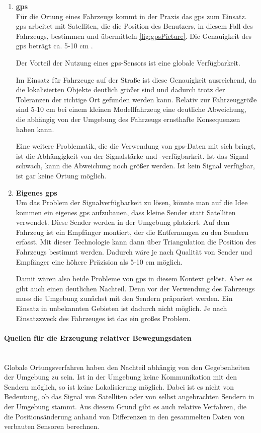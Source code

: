 \begin{enumerate}[leftmargin=*]
    \item \textbf{\acf{gps}} \\
    Für die Ortung eines Fahrzeugs kommt in der Praxis das \ac{gps} zum Einsatz. 
    \ac{gps} arbeitet mit Satelliten, die die Position des Benutzers, in diesem Fall des Fahrzeugs, bestimmen und übermitteln \cite{ashby2003relativity} \autoref{fig:gpsPicture}. 
    Die Genauigkeit des \ac{gps} beträgt ca. 5-10 cm \cite{ashby2003relativity}.

    Der Vorteil der Nutzung eines \ac{gps}-Sensors ist eine globale Verfügbarkeit.

    Im Einsatz für Fahrzeuge auf der Straße ist diese Genauigkeit ausreichend, 
    da die lokalisierten Objekte deutlich größer sind und dadurch trotz der Toleranzen der richtige Ort gefunden werden kann.
    Relativ zur Fahrzeuggröße sind 5-10 cm bei einem kleinen Modellfahrzeug eine deutliche Abweichung, die abhängig von der Umgebung des Fahrzeugs ernsthafte Konsequenzen haben kann.

    Eine weitere Problematik, die die Verwendung von \ac{gps}-Daten mit sich bringt, ist die Abhängigkeit von der Signalstärke und -verfügbarkeit. 
    Ist das Signal schwach, kann die Abweichung noch größer werden. 
    Ist kein Signal verfügbar, ist gar keine Ortung möglich.
    
    \item \textbf{Eigenes \ac{gps}} \\
    Um das Problem der Signalverfügbarkeit zu lösen, könnte man auf die Idee kommen ein eigenes \acf{gps} aufzubauen, dass kleine Sender statt Satelliten verwendet.
    Diese Sender werden in der Umgebung platziert. 
    Auf dem Fahrzeug ist ein Empfänger montiert, der die Entfernungen zu den Sendern erfasst.
    Mit dieser Technologie kann dann über Triangulation die Position des Fahrzeugs bestimmt werden. 
    Dadurch wäre je nach Qualität von Sender und Empfänger eine höhere Präzision als 5-10 cm möglich. 
    
    Damit wären also beide Probleme von \ac{gps} in diesem Kontext gelöst. 
    Aber es gibt auch einen deutlichen Nachteil. 
    Denn vor der Verwendung des Fahrzeugs muss die Umgebung zunächst mit den Sendern präpariert werden. 
    Ein Einsatz in unbekannten Gebieten ist dadurch nicht möglich. 
    Je nach Einsatzzweck des Fahrzeuges ist das ein großes Problem.
\end{enumerate}

\paragraph{Quellen für die Erzeugung relativer Bewegungsdaten} \mbox{}\\
Globale Ortungsverfahren haben den Nachteil abhängig von den Gegebenheiten der Umgebung zu sein.
Ist in der Umgebung keine Kommunikation mit den Sendern möglich, so ist keine Lokalisierung möglich.
Dabei ist es nicht von Bedeutung, ob das Signal von Satelliten oder von selbst angebrachten Sendern in der Umgebung stammt.
Aus diesem Grund gibt es auch relative Verfahren, die die Positionsänderung anhand von Differenzen in den gesammelten Daten von verbauten Sensoren berechnen.

